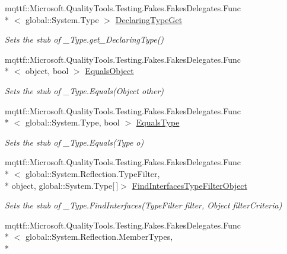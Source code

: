 \begin{DoxyCompactItemize}
mqttf\-::\-Microsoft.\-Quality\-Tools.\-Testing.\-Fakes.\-Fakes\-Delegates.\-Func\\*
$<$ global\-::\-System.\-Type $>$ \hyperlink{class_system_1_1_runtime_1_1_interop_services_1_1_fakes_1_1_stub___type_af166526cf34260a419c70c1eedcee38d}{Declaring\-Type\-Get}
\begin{DoxyCompactList}\small\item\em Sets the stub of \-\_\-\-Type.\-get\-\_\-\-Declaring\-Type()\end{DoxyCompactList}\item 
mqttf\-::\-Microsoft.\-Quality\-Tools.\-Testing.\-Fakes.\-Fakes\-Delegates.\-Func\\*
$<$ object, bool $>$ \hyperlink{class_system_1_1_runtime_1_1_interop_services_1_1_fakes_1_1_stub___type_a495649039bffed314ab09778b67890a7}{Equals\-Object}
\begin{DoxyCompactList}\small\item\em Sets the stub of \-\_\-\-Type.\-Equals(\-Object other)\end{DoxyCompactList}\item 
mqttf\-::\-Microsoft.\-Quality\-Tools.\-Testing.\-Fakes.\-Fakes\-Delegates.\-Func\\*
$<$ global\-::\-System.\-Type, bool $>$ \hyperlink{class_system_1_1_runtime_1_1_interop_services_1_1_fakes_1_1_stub___type_a0ac24c6deba7472c904126b8ab8ecc84}{Equals\-Type}
\begin{DoxyCompactList}\small\item\em Sets the stub of \-\_\-\-Type.\-Equals(\-Type o)\end{DoxyCompactList}\item 
mqttf\-::\-Microsoft.\-Quality\-Tools.\-Testing.\-Fakes.\-Fakes\-Delegates.\-Func\\*
$<$ global\-::\-System.\-Reflection.\-Type\-Filter, \\*
object, global\-::\-System.\-Type\mbox{[}$\,$\mbox{]}$>$ \hyperlink{class_system_1_1_runtime_1_1_interop_services_1_1_fakes_1_1_stub___type_ae2c0d58388542abd8e34b970d1a0e5bf}{Find\-Interfaces\-Type\-Filter\-Object}
\begin{DoxyCompactList}\small\item\em Sets the stub of \-\_\-\-Type.\-Find\-Interfaces(\-Type\-Filter filter, Object filter\-Criteria)\end{DoxyCompactList}\item 
mqttf\-::\-Microsoft.\-Quality\-Tools.\-Testing.\-Fakes.\-Fakes\-Delegates.\-Func\\*
$<$ global\-::\-System.\-Reflection.\-Member\-Types, \\*

\end{DoxyCompactItemize}
